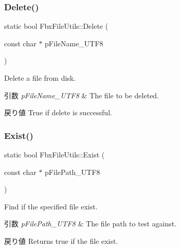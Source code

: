 \subsubsection{\texorpdfstring{Delete()}{Delete()}}
{\footnotesize\ttfamily static bool Fbx\+File\+Utils\+::\+Delete (\begin{DoxyParamCaption}\item[{const char $\ast$}]{p\+File\+Name\+\_\+\+U\+T\+F8 }\end{DoxyParamCaption})\hspace{0.3cm}{\ttfamily [static]}}

Delete a file from disk. 
\begin{DoxyParams}{引数}
{\em p\+File\+Name\+\_\+\+U\+T\+F8} & The file to be deleted. \\
\hline
\end{DoxyParams}
\begin{DoxyReturn}{戻り値}
True if delete is successful. 
\end{DoxyReturn}
\mbox{\label{class_fbx_file_utils_afd22767320467beb7ba9488c15376ddc}} 
\subsubsection{\texorpdfstring{Exist()}{Exist()}}
{\footnotesize\ttfamily static bool Fbx\+File\+Utils\+::\+Exist (\begin{DoxyParamCaption}\item[{const char $\ast$}]{p\+File\+Path\+\_\+\+U\+T\+F8 }\end{DoxyParamCaption})\hspace{0.3cm}{\ttfamily [static]}}

Find if the specified file exist. 
\begin{DoxyParams}{引数}
{\em p\+File\+Path\+\_\+\+U\+T\+F8} & The file path to test against. \\
\hline
\end{DoxyParams}
\begin{DoxyReturn}{戻り値}
Returns true if the file exist. 
\end{DoxyReturn}
\mbox{\label{class_fbx_file_utils_aa828e725caf5d34b9ae12abc1c0b8993}} 
